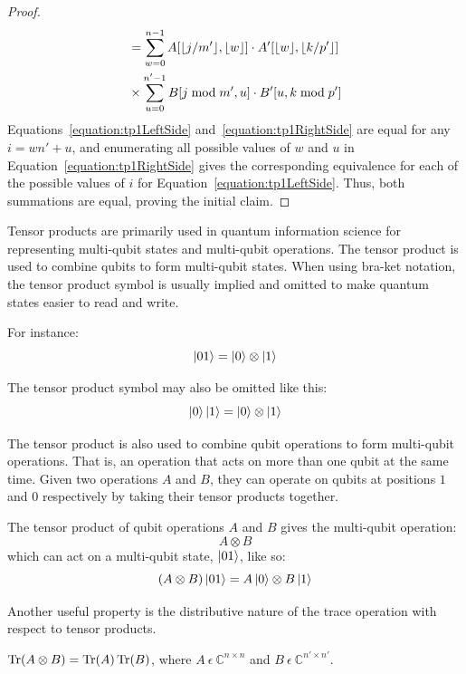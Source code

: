 \begin{proof}
\begin{align}
\begin{split}
&=\sum_{w=0}^{n-1} A[\lfloor j/m'\rfloor,\lfloor w\rfloor] \cdot A'[\lfloor w\rfloor,\lfloor k / p'\rfloor]\\
&\times \sum_{u=0}^{n'-1}  B[j \bmod m',u] \cdot B'[u,k \bmod p'] \\ \label{equation:tp1RightSide}
\end{split}
\end{align}
Equations~\eqref{equation:tp1LeftSide} and~\eqref{equation:tp1RightSide} are equal for any $i = wn'+u$, and enumerating all possible values of $w$ and $u$ in Equation~\eqref{equation:tp1RightSide} gives the corresponding equivalence for each of the possible values of $i$ for Equation~\eqref{equation:tp1LeftSide}. Thus, both summations are equal, proving the initial claim.
\end{proof}

Tensor products are primarily used in quantum information science for representing multi-qubit states and multi-qubit operations. The tensor product is used to combine qubits to form multi-qubit states. When using bra-ket notation, the tensor product symbol is usually implied and omitted to make quantum states easier to read and write.
\begin{example}
For instance:
$$\Ket{01} = \Ket{0} \otimes \Ket{1}$$
\end{example}
\begin{example}
The tensor product symbol may also be omitted like this:
$$\Ket{0}\Ket{1} = \Ket{0} \otimes \Ket{1}$$
\end{example}
The tensor product is also used to combine qubit operations to form multi-qubit operations. That is, an operation that acts on more than one qubit at the same time. Given two operations $A$ and $B$, they can operate on qubits at positions $1$ and $0$ respectively by taking their tensor products together.
\begin{example}
The tensor product of qubit operations $A$ and $B$ gives the multi-qubit operation:
$$A \otimes B$$
which can act on a multi-qubit state, $\Ket{01}$, like so:
$$(A \otimes B)\Ket{01} = A\Ket{0} \otimes B\Ket{1}$$
\end{example}
Another useful property is the distributive nature of the trace operation with respect to tensor products. 
\begin{theorem}
\label{theorem:traceTensorDistribute}
$\operatorname{Tr}(A \otimes B) = \operatorname{Tr}(A)\operatorname{Tr}(B)$, where $A \ \epsilon \ \mathbb{C}^{n \times n}$ and $B \ \epsilon \ \mathbb{C}^{n' \times n'}$.
\end{theorem}
